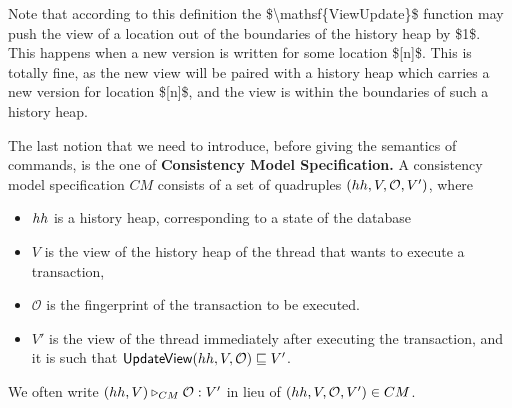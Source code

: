 \documentclass[a4paper,UKenglish]{article}%
\theoremstyle{plain}
\begin{document}
\ac{Note that according to this definition the $\mathsf{ViewUpdate}$ function may push the view of a 
location out of the boundaries of the history heap by $1$. This happens when a new version is written 
for some location $[n]$. This is totally fine, as the new view will be paired with a history heap which 
carries a new version for location $[n]$, and the view is within the boundaries of such a history heap.}


The last notion that we need to introduce, before giving the semantics of commands, 
is the one of \textbf{Consistency Model Specification.} 
A consistency model specification $CM$ consists of a set of quadruples 
$(hh, V, \mathcal{O}, V')$, where 
\begin{itemize}
\item $hh$ is a history heap, corresponding to a state of the database
\item $V$ is the view of the history heap of the thread that wants to execute a 
transaction, 
\item $\mathcal{O}$ is the fingerprint of the transaction to be executed.
\item $V'$ is the view of the thread immediately after executing the transaction, 
and it is such that $\mathsf{UpdateView}(hh, V, \mathcal{O}) \sqsubseteq V'$.
\end{itemize}
We often write $(hh, V) \triangleright_{CM} \mathcal{O} : V'$ in lieu 
of $(hh, V, \mathcal{O}, V') \in CM$.
\end{document}
